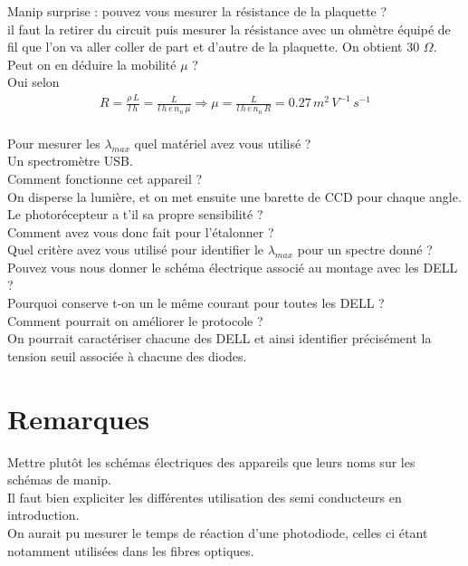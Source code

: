\documentclass[12pt,prb,aps,epsf]{report}
\begin{document}
Manip surprise : pouvez vous mesurer la résistance de la plaquette ?\\
il faut la retirer du circuit puis mesurer la résistance avec un ohmètre équipé de fil que l'on va aller coller de part et d'autre de la plaquette. On obtient 30 $\Omega$.\\ Peut on en déduire la mobilité  $\mu$ ?\\
Oui selon
\begin{eqnarray}
R = \frac{\rho\, L}{l\,h} = \frac{L}{l\,h\,e\,n_n\,\mu} \Rightarrow \mu = \frac{L}{l\,h\,e\,n_n\,R} = 0.27\,m^2\,V^{-1}\,s^{-1}
\end{eqnarray}
\\
Pour mesurer les $\lambda_{max}$ quel matériel avez vous utilisé ?\\
Un spectromètre USB.\\

Comment fonctionne cet appareil ?\\
On disperse la lumière, et on met ensuite une barette de CCD pour chaque angle.\\

Le photorécepteur a t'il sa propre sensibilité ?\\

Comment avez vous donc fait pour l'étalonner ?\\

Quel critère avez vous utilisé pour identifier le $\lambda_{max}$ pour un spectre donné ?\\

Pouvez vous nous donner le schéma électrique associé au montage avec les DELL ?\\

Pourquoi conserve t-on un le même courant pour toutes les DELL ?\\

Comment pourrait on améliorer le protocole ?\\
On pourrait caractériser chacune des DELL et ainsi identifier précisément la tension seuil associée à chacune des diodes.


\section*{Remarques}
Mettre plutôt les schémas électriques des appareils que leurs noms sur les schémas de manip.\\
Il faut bien expliciter les différentes utilisation des semi conducteurs en introduction.\\
On aurait pu mesurer le temps de réaction d'une photodiode, celles ci étant notamment utilisées dans les fibres optiques.
	
\end{document}
